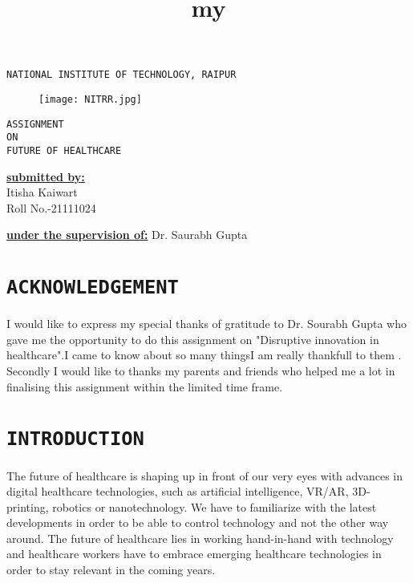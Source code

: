 \documentclass[12pt]{article}
\title{my}
\begin{document}
\centering\huge\texttt{NATIONAL INSTITUTE OF TECHNOLOGY, RAIPUR}\\

\begin{figure}[h]
\centering
\texttt{[image: NITRR.jpg]}
\end{figure}

\begin{center}


\huge\texttt{ASSIGNMENT \\ON\\ FUTURE OF HEALTHCARE}

\end{center}

\begin{minipage}[t]{5cm}


\flushleft\Large\textbf{\underline{submitted by:}}\\
Itisha Kaiwart\\
Roll No.-21111024
\end{minipage}
\hfill
\begin{minipage}[t]{5cm}


\Large\textbf{\underline{under the supervision of:}}
Dr. Saurabh Gupta
\end{minipage}
\pagebreak
\tableofcontents
\pagebreak

\section{\centering\Large\texttt{ACKNOWLEDGEMENT}}

\large \flushleft I would like to express my special thanks of gratitude to Dr. Sourabh Gupta who gave me the opportunity to do this assignment on "Disruptive innovation in healthcare".I came to know about so many thingsI am really thankfull to them .\\



\vspace{1cm}
Secondly I would like to thanks my parents and friends who helped me a lot in finalising this assignment within the limited time frame.

\pagebreak


\section{\centering\Large\texttt{INTRODUCTION}}

\vspace{0.5cm}
\large\flushleft The future of healthcare is shaping up in front of our very eyes with advances in digital healthcare technologies, such as artificial intelligence, VR/AR, 3D-printing, robotics or nanotechnology. We have to familiarize with the latest developments in order to be able to control technology and not the other way around. The future of healthcare lies in working hand-in-hand with technology and healthcare workers have to embrace emerging healthcare technologies in order to stay relevant in the coming years. \\
\end{document}
